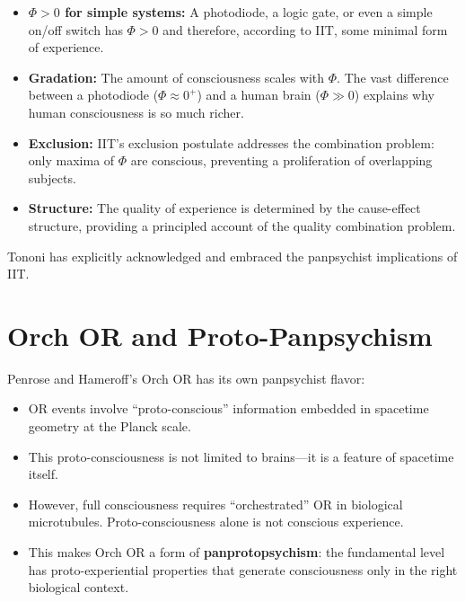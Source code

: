 \documentclass[11pt,a4paper]{report}
\begin{document}
\begin{compbox}
\begin{itemize}[leftmargin=1.5em]
  \item \textbf{$\Phi > 0$ for simple systems:} A photodiode, a logic gate, or even a simple on/off switch has $\Phi > 0$ and therefore, according to IIT, some minimal form of experience.
  \item \textbf{Gradation:} The amount of consciousness scales with $\Phi$. The vast difference between a photodiode ($\Phi \approx 0^+$) and a human brain ($\Phi \gg 0$) explains why human consciousness is so much richer.
  \item \textbf{Exclusion:} IIT's exclusion postulate addresses the combination problem: only maxima of $\Phi$ are conscious, preventing a proliferation of overlapping subjects.
  \item \textbf{Structure:} The quality of experience is determined by the cause-effect structure, providing a principled account of the quality combination problem.
\end{itemize}
Tononi has explicitly acknowledged and embraced the panpsychist implications of IIT.
\end{compbox}

\section{Orch OR and Proto-Panpsychism}

Penrose and Hameroff's Orch OR has its own panpsychist flavor:

\begin{compbox}
\begin{itemize}[leftmargin=1.5em]
  \item OR events involve ``proto-conscious'' information embedded in spacetime geometry at the Planck scale.
  \item This proto-consciousness is not limited to brains---it is a feature of spacetime itself.
  \item However, full consciousness requires ``orchestrated'' OR in biological microtubules. Proto-consciousness alone is not conscious experience.
  \item This makes Orch OR a form of \textbf{panprotopsychism}: the fundamental level has proto-experiential properties that generate consciousness only in the right biological context.
\end{itemize}
\end{compbox}
\end{document}
